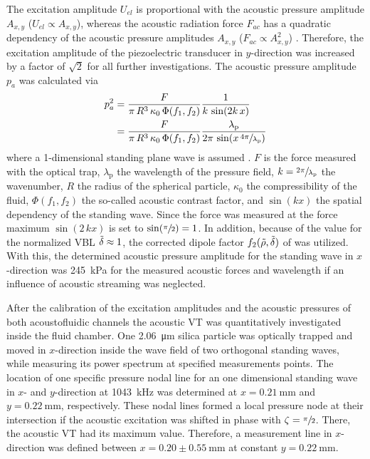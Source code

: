 The excitation amplitude $U_{el}$ is proportional with the acoustic pressure 
amplitude $A_{x,y}$ ($U_{el} \propto A_{x,y}$), whereas the acoustic radiation 
force $F_{ac}$ has a quadratic dependency of the acoustic pressure amplitudes 
$A_{x,y}$ ($F_{ac} \propto A_{x,y}^2$) \cite{Barnkob2010}. Therefore, the 
excitation amplitude of the piezoelectric transducer in $y$-direction was 
increased by a factor of $\sqrt{2}$ for all further investigations. The acoustic 
pressure amplitude $p_{a}$ was calculated via
\begin{equation}
\label{eq:VT-PressurePredictions}
\begin{split}
p_{a}^{2} &= \frac{F}{\pi\,R^{3}\,\kappa_{0}\,\Phi(f_{1},f_{2})} 
\frac{1}{k\,\sin(2k\,x)}\\
&= \frac{F}{\pi\,R^{3}\,\kappa_{0}\,\Phi(f_{1},f_{2})} 
\frac{\lambda_{\text{p}}}{2\pi\,\sin(x\,\sfrac{4\pi}{\lambda_{\text{p}}})}
\end{split}
\end{equation}
where a 1-dimensional standing plane wave is assumed \cite{Settnes2012a}. $F$ is 
the force measured with the optical trap, $\lambda_{\text{p}}$ the wavelength of 
the pressure field, $k = \sfrac{2\pi}{\lambda_{\text{p}}}$ the wavenumber, $R$ 
the radius of the spherical particle, $\kappa_{0}$ the compressibility of the 
fluid, $\Phi(f_{1},f_{2})$ the so-called acoustic contrast factor, and 
$\sin(kx)$ the spatial dependency of the standing wave.  Since the force was 
measured at the force maximum $\sin(2\,kx)$ is set to $\sin(\sfrac{\pi}{2}) = 
1$. In addition, because of the value for the normalized VBL 
$\tilde{\delta} \approx 1$, the corrected dipole factor  
$f_{2}(\tilde{\rho},\tilde{\delta})$ of \citeauthor{Settnes2012} 
\cite{Settnes2012} was utilized. With this, the determined acoustic pressure 
amplitude for the standing wave in $x$-direction was \SI{245}{\kilo\pascal} for 
the measured acoustic forces and wavelength if an influence of acoustic 
streaming was neglected. 

After the calibration of the excitation amplitudes and the acoustic pressures of 
both acoustofluidic channels the acoustic VT was quantitatively investigated 
inside the fluid chamber. One \SI{2.06}{\micro\meter} silica particle was 
optically trapped and moved in $x$-direction inside the wave field of two 
orthogonal standing waves, while measuring its power spectrum at specified 
measurements points. The location of one specific pressure nodal line for an one 
dimensional standing wave in $x$- and $y$-direction at \SI{1043}{\kilo\hertz} 
was determined at $x=\SI{0.21}{\mm}$ and $y=\SI{0.22}{\mm}$, respectively. These 
nodal lines formed a local pressure node at their intersection if the acoustic 
excitation was shifted in phase with $\zeta = \sfrac{\pi}{2}$. There, the 
acoustic VT had its maximum value. Therefore, a measurement line in 
$x$-direction was defined between $x=0.20\pm0.55~\si{\milli\meter}$ at constant 
$y=\SI{0.22}{\milli\meter}$.

